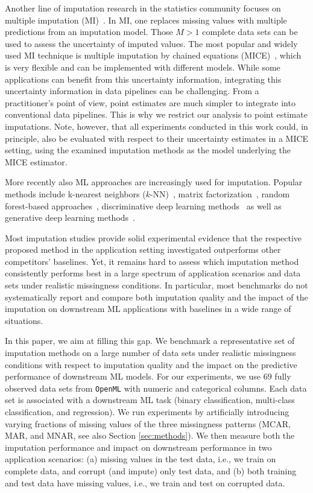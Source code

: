 \documentclass[utf8]{frontiersSCNS} %
\newcommand{\code}[1]{\texttt{#1}}
\begin{document}
Another line of imputation research in the statistics community focuses on multiple imputation (MI)~\citep{Rubin_MI}. In MI, one replaces missing values with multiple predictions from an imputation model. Those $M > 1$ complete data sets can be used to assess the uncertainty of imputed values. The most popular and widely used MI technique is multiple imputation by chained equations (MICE)~\citep{Little, vanBuuren2018}, which is very flexible and can be implemented with different models. While some applications can benefit from this uncertainty information, integrating this uncertainty information in data pipelines can be challenging. From a practitioner's point of view, point estimates are much simpler to integrate into conventional data pipelines. This is why we restrict our analysis to point estimate imputations. Note, however, that all experiments conducted in this work could, in principle, also be evaluated with respect to their uncertainty estimates in a MICE setting, using the examined imputation methods as the model underlying the MICE estimator.

More recently also ML approaches are increasingly used for imputation. Popular methods include k-nearest neighbors ($k$-NN)~\citep{Batista2003}, matrix factorization~\citep{Troyanskaya2001,Koren2009,Mazumder2010}, random forest-based approaches~\citep{Stekhoven2012}, discriminative deep learning methods~\citep{Biessmann2018a} as well as generative deep learning methods~\citep{GAIN, HIVAE, VAE_for_genomic_data, MisGAN, VIGAN}.

Most imputation studies provide solid experimental evidence that the respective proposed method in the application setting investigated outperforms other competitors' baselines. Yet, it remains hard to assess which imputation method consistently performs best in a large spectrum of application scenarios and data sets under realistic missingness conditions. In particular, most benchmarks do not systematically report and compare both imputation quality and the impact of the imputation on downstream ML applications with baselines in a wide range of situations.

In this paper, we aim at filling this gap. We benchmark a representative set of imputation methods on a large number of data sets under realistic missingness conditions with respect to imputation quality and the impact on the predictive performance of downstream ML models. For our experiments, we use $69$ fully observed data sets from \code{OpenML} \citep{OpenML2013} with numeric and categorical columns. Each data set is associated with a downstream ML task (binary classification, multi-class classification, and regression). We run experiments by artificially introducing varying fractions of missing values of the three missingness patterns (MCAR, MAR, and MNAR, see also Section \ref{sec:methods}). We then measure both the imputation performance and impact on downstream performance in two application scenarios: (a) missing values in the test data, i.e., we train on complete data, and corrupt (and impute) only test data, and (b) both training and test data have missing values, i.e., we train and test on corrupted data.
\end{document}
